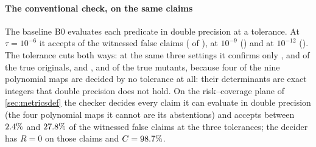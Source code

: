 \documentclass[preprint,11pt,a4paper]{elsarticle}
\theoremstyle{definition}
\begin{document}
\paragraph{The conventional check, on the same claims}
The baseline B0 evaluates each predicate in double precision at a tolerance. At $\tau=10^{-6}$ it accepts \MtSaFloatFalseSix{} of the witnessed false claims (\MtSaFloatFalseNSix{} of \MtSaFalseWitnessed), at $10^{-9}$ \MtSaFloatFalseNine{} (\MtSaFloatFalseNNine) and at $10^{-12}$ \MtSaFloatFalseTwelve{} (\MtSaFloatFalseNTwelve). The tolerance cuts both ways: at the same three settings it confirms only \MtSaFloatOrigSix, \MtSaFloatOrigNine{} and \MtSaFloatOrigTwelve{} of the \MtSaMutObjects{} true originals, and \MtSaFloatTrueSix, \MtSaFloatTrueNine{} and \MtSaFloatTrueTwelve{} of the \MtSaTrue{} true mutants, because four of the nine polynomial maps are decided by no tolerance at all: their determinants are exact integers that double precision does not hold. On the risk--coverage plane of \cref{sec:metricsdef} the checker decides every claim it can evaluate in double precision (the four polynomial maps it cannot are its abstentions) and accepts between $2.4\%$ and $27.8\%$ of the witnessed false claims at the three tolerances; the decider has $R=0$ on those claims and $C=98.7\%$.
\end{document}
